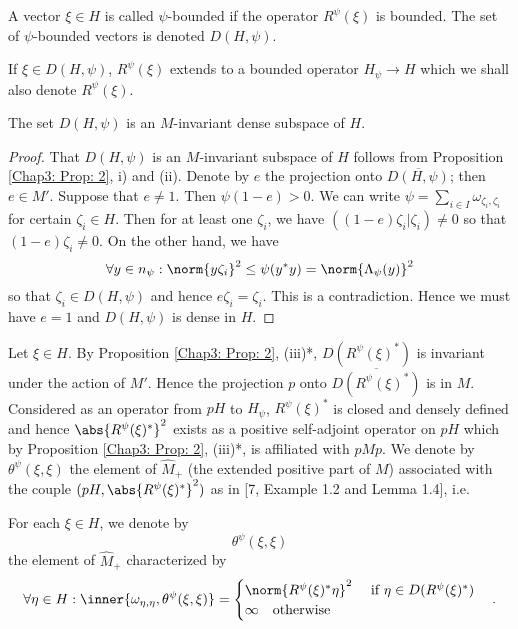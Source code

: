 \begin{definition}
    A vector $\xi\in H$ is called $\psi$-bounded if the operator $R^\psi(\xi)$ is bounded. The set of $\psi$-bounded vectors is denoted $D(H,\psi)$.
\end{definition}
\begin{notation}
    If $\xi\in D(H,\psi)$, $R^\psi(\xi)$ extends to a bounded operator $H_\psi\to H$ which we shall also denote $R^\psi(\xi)$.
\end{notation}
\begin{proposition}\label{Chap3: Prop: 4}
    The set $D(H,\psi)$ is an $M$-invariant dense subspace
    of $H$.
\end{proposition}
\begin{proof}
    That $D(H,\psi)$ is an $M$-invariant subspace of $H$ follows from Proposition \ref{Chap3: Prop: 2}, i) and (ii). Denote by $e$ the projection onto $\overline{D(H,\psi)}$; then $e\in M'$. Suppose that $e\neq 1$. Then $\psi(1-e)>0$. We can write $\psi=\sum_{i\in I}\omega_{\zeta_i,\zeta_i}$ for certain $\zeta_i\in H$. Then for at least one $\zeta_i$, we have $((1-e)\zeta_i|\zeta_i)\neq 0$ so that $(1-e)\zeta_i\neq 0$. On the other hand, we have
    \[
        \forall y\in n_\psi:\norm{y\zeta_i}^2\leq \psi(y^*y)=\norm{\Lambda_\psi(y)}^2
    \]
    so that $\zeta_i\in D(H,\psi)$ and hence $e\zeta_i = \zeta_i$. This is a contradiction. Hence we must have $e = 1$ and $D(H,\psi)$ is dense in $H$.
\end{proof}
Let $\xi\in H$. By Proposition \ref{Chap3: Prop: 2}, (iii)*, $D(R^\psi(\xi)^*)$ is invariant under the action of $M'$. Hence the projection $p$ onto $\overline{D(R^\psi(\xi)^*)}$ is in $M$. Considered as an operator from $pH$ to $H_\psi$, $R^\psi(\xi)^*$ is closed and densely defined and hence $\abs{R^\psi(\xi)^*}^2$ exists as a positive self-adjoint operator on $pH$ which by Proposition \ref{Chap3: Prop: 2}, (iii)*, is affiliated with $pMp$. We denote by $\theta^\psi(\xi,\xi)$ the element of $\widehat{M}_+$ (the extended positive part of $M$) associated with the couple $(pH,\abs{R^\psi(\xi)^*}^2)$ as in [7, Example 1.2 and Lemma 1.4], i.e.
\begin{definition}\label{Chap3: Def: 5}
    For each $\xi\in H$, we denote by
    \[
        \theta^\psi(\xi,\xi)
    \]
    the element of $\widehat{M}_+$ characterized by
    \begin{equation}
        \forall \eta\in H: \inner{\omega_{\eta,\eta},\theta^\psi(\xi,\xi)}=\begin{cases}
            \norm{R^\psi(\xi)^*\eta}^2\quad \text{ if } \eta\in D(R^\psi(\xi)^*) \\
            \infty\quad \text{otherwise}
        \end{cases}.
    \end{equation}
\end{definition}
